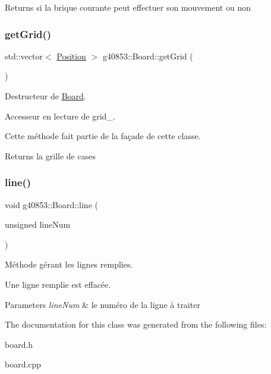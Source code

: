 \begin{DoxyReturn}{Returns}
si la brique courante peut effectuer son mouvement ou non 
\end{DoxyReturn}
\hypertarget{classg40853_1_1_board_ae3d7d771be75130c65c592c1d13527a1}{}\label{classg40853_1_1_board_ae3d7d771be75130c65c592c1d13527a1} 
\subsubsection{\texorpdfstring{get\+Grid()}{getGrid()}}
{\footnotesize\ttfamily std\+::vector$<$ \hyperlink{classg40853_1_1_position}{Position} $>$ g40853\+::\+Board\+::get\+Grid (\begin{DoxyParamCaption}{ }\end{DoxyParamCaption})\hspace{0.3cm}{\ttfamily [inline]}}



Destructeur de \hyperlink{classg40853_1_1_board}{Board}. 

Accesseur en lecture de grid\+\_\+.

Cette méthode fait partie de la façade de cette classe.

\begin{DoxyReturn}{Returns}
la grille de cases 
\end{DoxyReturn}
\hypertarget{classg40853_1_1_board_a620510bbdc174bd73f27c6fc1f37ada1}{}\label{classg40853_1_1_board_a620510bbdc174bd73f27c6fc1f37ada1} 
\subsubsection{\texorpdfstring{line()}{line()}}
{\footnotesize\ttfamily void g40853\+::\+Board\+::line (\begin{DoxyParamCaption}\item[{unsigned}]{line\+Num }\end{DoxyParamCaption})}



Méthode gérant les lignes remplies. 

Une ligne remplie est effacée.


\begin{DoxyParams}{Parameters}
{\em line\+Num} & le numéro de la ligne à traiter \\
\hline
\end{DoxyParams}


The documentation for this class was generated from the following files\+:\begin{DoxyCompactItemize}
\item 
board.\+h\item 
board.\+cpp\end{DoxyCompactItemize}
